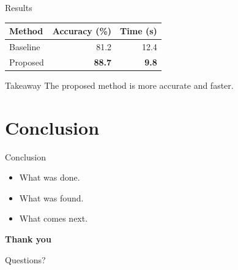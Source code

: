 \documentclass[aspectratio=169,11pt]{beamer}
\begin{document}
\begin{frame}{Results}
  \centering
  \begin{tabular}{@{}lrr@{}}
    \toprule
    Method & Accuracy (\%) & Time (s) \\
    \midrule
    Baseline & 81.2 & 12.4 \\
    Proposed & \textbf{88.7} & \textbf{9.8} \\
    \bottomrule
  \end{tabular}
  \vspace{1em}
  \begin{alertblock}{Takeaway}
    The proposed method is more accurate and faster.
  \end{alertblock}
\end{frame}

\section{Conclusion}

\begin{frame}{Conclusion}
  \begin{itemize}
    \item What was done.
    \item What was found.
    \item What comes next.
  \end{itemize}
\end{frame}

\begin{frame}[plain]
  \centering
  \vfill
  {\Large\bfseries\color{iitmnavy} Thank you}\par
  \medskip
  Questions?
  \vfill
\end{frame}
\end{document}
